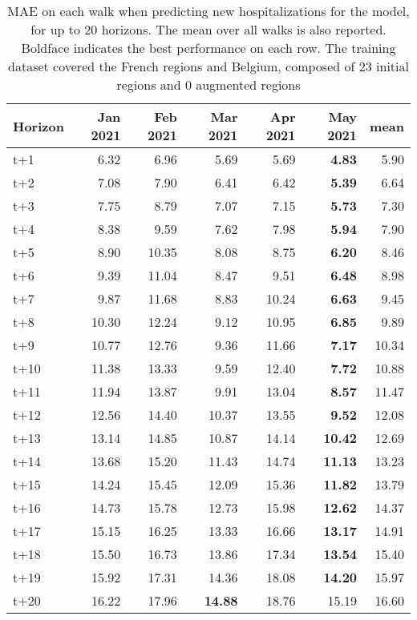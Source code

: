 \begin{table}[H]
\centering
\caption{MAE on each walk when predicting new hospitalizations for the model, for up to 20 horizons. The mean over all walks is also reported. Boldface indicates the best performance on each row. The training dataset covered the French regions and Belgium, composed of 23 initial regions and 0 augmented regions }
\label{tab:MAE_walk_assembly}
\begin{tabular}{lrrrrrr}
\toprule
Horizon &  Jan 2021 &  Feb 2021 &  Mar 2021 &  Apr 2021 &  May 2021 &  mean \\
\midrule
t+1  & 6.32  & 6.96  & 5.69  & 5.69  & \textbf{4.83}  & 5.90  \\
t+2  & 7.08  & 7.90  & 6.41  & 6.42  & \textbf{5.39}  & 6.64  \\
t+3  & 7.75  & 8.79  & 7.07  & 7.15  & \textbf{5.73}  & 7.30  \\
t+4  & 8.38  & 9.59  & 7.62  & 7.98  & \textbf{5.94}  & 7.90  \\
t+5  & 8.90  & 10.35  & 8.08  & 8.75  & \textbf{6.20}  & 8.46  \\
t+6  & 9.39  & 11.04  & 8.47  & 9.51  & \textbf{6.48}  & 8.98  \\
t+7  & 9.87  & 11.68  & 8.83  & 10.24  & \textbf{6.63}  & 9.45  \\
t+8  & 10.30  & 12.24  & 9.12  & 10.95  & \textbf{6.85}  & 9.89  \\
t+9  & 10.77  & 12.76  & 9.36  & 11.66  & \textbf{7.17}  & 10.34  \\
t+10  & 11.38  & 13.33  & 9.59  & 12.40  & \textbf{7.72}  & 10.88  \\
t+11  & 11.94  & 13.87  & 9.91  & 13.04  & \textbf{8.57}  & 11.47  \\
t+12  & 12.56  & 14.40  & 10.37  & 13.55  & \textbf{9.52}  & 12.08  \\
t+13  & 13.14  & 14.85  & 10.87  & 14.14  & \textbf{10.42}  & 12.69  \\
t+14  & 13.68  & 15.20  & 11.43  & 14.74  & \textbf{11.13}  & 13.23  \\
t+15  & 14.24  & 15.45  & 12.09  & 15.36  & \textbf{11.82}  & 13.79  \\
t+16  & 14.73  & 15.78  & 12.73  & 15.98  & \textbf{12.62}  & 14.37  \\
t+17  & 15.15  & 16.25  & 13.33  & 16.66  & \textbf{13.17}  & 14.91  \\
t+18  & 15.50  & 16.73  & 13.86  & 17.34  & \textbf{13.54}  & 15.40  \\
t+19  & 15.92  & 17.31  & 14.36  & 18.08  & \textbf{14.20}  & 15.97  \\
t+20  & 16.22  & 17.96  & \textbf{14.88}  & 18.76  & 15.19  & 16.60  \\

\bottomrule
\end{tabular}
\end{table}
